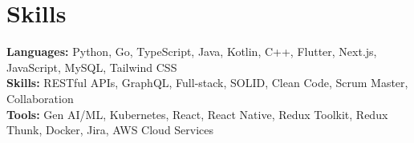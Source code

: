 \documentclass[11pt]{article}       %
\begin{document}
\vspace{-18.5pt}


\section*{Skills}
\textbf{Languages:} Python, Go, TypeScript, Java, Kotlin, C++, Flutter, Next.js, JavaScript, MySQL, Tailwind CSS\\
\textbf{Skills:} RESTful APIs, GraphQL, Full-stack, SOLID, Clean Code, Scrum Master, Collaboration\\
\textbf{Tools:} Gen AI/ML, Kubernetes, React, React Native, Redux Toolkit, Redux Thunk, Docker, Jira, AWS Cloud Services\\

\vspace{-6.5pt}
\end{document}
